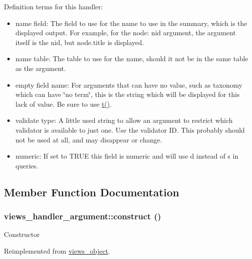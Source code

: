 Definition terms for this handler:\begin{itemize}
\item name field: The field to use for the name to use in the summary, which is the displayed output. For example, for the node: nid argument, the argument itself is the nid, but node.title is displayed.\item name table: The table to use for the name, should it not be in the same table as the argument.\item empty field name: For arguments that can have no value, such as taxonomy which can have \char`\"{}no term\char`\"{}, this is the string which will be displayed for this lack of value. Be sure to use \hyperlink{common_8inc_41d20f0c822bf1f3c26a97981c762665}{t()}.\item validate type: A little used string to allow an argument to restrict which validator is available to just one. Use the validator ID. This probably should not be used at all, and may disappear or change.\item numeric: If set to TRUE this field is numeric and will use d instead of s in queries. \end{itemize}


\subsection{Member Function Documentation}
\hypertarget{classviews__handler__argument_93594a31e95e1a14cead4f038d7b321b}{
\subsubsection[{construct}]{\setlength{\rightskip}{0pt plus 5cm}views\_\-handler\_\-argument::construct ()}}
\label{classviews__handler__argument_93594a31e95e1a14cead4f038d7b321b}


Constructor 

Reimplemented from \hyperlink{classviews__object_6583d6be7e59dd1e39056e320ea2c2d4}{views\_\-object}.

